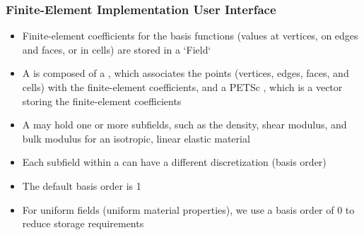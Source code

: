 \documentclass[aspectratio=169]{beamer}
\begin{document}
\begin{frame}
  \frametitle{Finite-Element Implementation User Interface}
  \summary{}

  \begin{itemize}
    \begin{itemize}
    \item Finite-element coefficients for the basis functions (values at vertices, on edges and faces, or in cells) are stored in a `Field`
    \item A  is composed of a , which associates the points (vertices, edges, faces, and cells) with the finite-element coefficients, and a PETSc , which is a vector storing the finite-element coefficients
    \item A  may hold one or more subfields, such as the density, shear modulus, and bulk modulus for an isotropic, linear elastic material
    \end{itemize}
    \begin{itemize}
    \item Each subfield within a  can have a different discretization (basis order)
    \item The default basis order is 1
    \item For uniform fields (uniform material properties), we use a basis order of 0 to reduce storage requirements
    \end{itemize}
  \end{itemize}

\end{frame}
\end{document}
